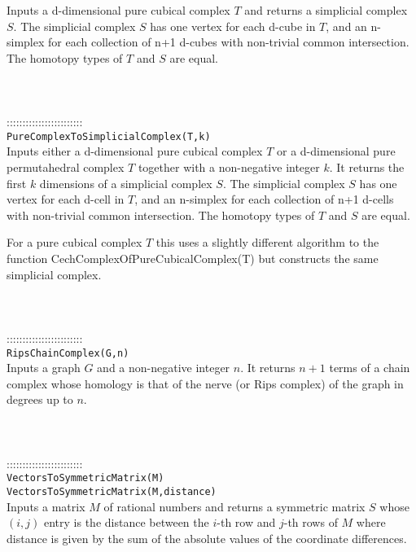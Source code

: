 \documentclass[a4paper,11pt]{report}
\begin{document}
{ Inputs a d-dimensional pure cubical complex $T$ and returns a simplicial complex $S$. The simplicial complex $S$ has one vertex for each d-cube in $T$, and an n-simplex for each collection of n+1 d-cubes with non-trivial common
intersection. The homotopy types of $T$ and $S$ are equal. \\
 \\
 \\
 \\
 ::::::::::::::::::::::::\\
 \texttt{PureComplexToSimplicialComplex(T,k)}\\
 

 Inputs either a d-dimensional pure cubical complex $T$ or a d-dimensional pure permutahedral complex $T$ together with a non-negative integer $k$. It returns the first $k$ dimensions of a simplicial complex $S$. The simplicial complex $S$ has one vertex for each d-cell in $T$, and an n-simplex for each collection of n+1 d-cells with non-trivial common
intersection. The homotopy types of $T$ and $S$ are equal. 

 For a pure cubical complex $T$ this uses a slightly different algorithm to the function
CechComplexOfPureCubicalComplex(T) but constructs the same simplicial complex. \\
 \\
 \\
 \\
 ::::::::::::::::::::::::\\
 \texttt{RipsChainComplex(G,n)}\\
 

 Inputs a graph $G$ and a non-negative integer $n$. It returns $n+1$ terms of a chain complex whose homology is that of the nerve (or Rips complex)
of the graph in degrees up to $n$. \\
 \\
 \\
 \\
 ::::::::::::::::::::::::\\
 \texttt{VectorsToSymmetricMatrix(M)}\\
 \texttt{VectorsToSymmetricMatrix(M,distance)}\\
 

 Inputs a matrix $M$ of rational numbers and returns a symmetric matrix $S$ whose $(i,j)$ entry is the distance between the $i$-th row and $j$-th rows of $M$ where distance is given by the sum of the absolute values of the coordinate
differences. 

}
\end{document}

